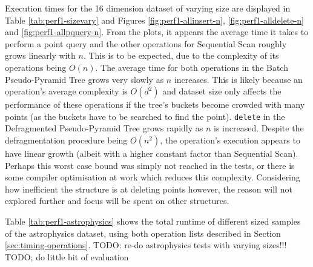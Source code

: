 Execution times for the 16 dimension dataset of varying size are displayed in Table \ref{tab:perf1-sizevary} and Figures \ref{fig:perf1-allinsert-n}, \ref{fig:perf1-alldelete-n} and \ref{fig:perf1-allpquery-n}. From the plots, it appears the average time it takes to perform a point query and the other operations for Sequential Scan roughly grows linearly with $n$. This is to be expected, due to the complexity of its operations being $O(n)$. The average time for both operations in the Batch Pseudo-Pyramid Tree grows very slowly as $n$ increases. This is likely because an operation's average complexity is $O(d^2)$ and dataset size only affects the performance of these operations if the tree's buckets become crowded with many points (as the buckets have to be searched to find the point). \texttt{delete} in the Defragmented Pseudo-Pyramid Tree grows rapidly as $n$ is increased. Despite the defragmentation procedure being $O(n^2)$, the operation's execution appears to have linear growth (albeit with a higher constant factor than Sequential Scan). Perhaps this worst case bound was simply not reached in the tests, or there is some compiler optimisation at work which reduces this complexity. Considering how inefficient the structure is at deleting points however, the reason will not explored further and focus will be spent on other structures.

Table \ref{tab:perf1-astrophysics} shows the total runtime of different sized samples of the astrophysics dataset, using both operation lists described in Section \ref{sec:timing-operations}.
TODO: re-do astrophysics tests with varying sizes!!!
TODO; do little bit of evaluation

